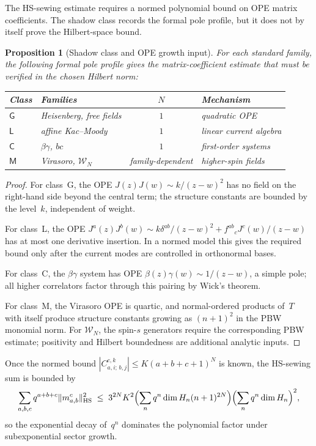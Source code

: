 \documentclass[11pt,reqno]{amsart}
\newtheorem{proposition}[theorem]{Proposition}
\theoremstyle{definition}
\theoremstyle{remark}
\newcommand{\cW}{\mathcal{W}}
\newcommand{\HS}{\mathrm{HS}}
\numberwithin{equation}{section}
\begin{document}
The HS-sewing estimate requires a normed polynomial bound on OPE
matrix coefficients. The shadow class records the formal pole
profile, but it does not by itself prove the Hilbert-space bound.

\begin{proposition}[Shadow class and OPE growth input]
\label{prop:shadow-hs}
For each standard family, the following formal pole profile gives the
matrix-coefficient estimate that must be verified in the chosen
Hilbert norm:
\begin{center}
\renewcommand{\arraystretch}{1.15}
\begin{tabular}{llcl}
\toprule
Class & Families & $N$ & Mechanism \\
\midrule
$\mathsf{G}$ & Heisenberg, free fields
 & $1$ & quadratic OPE \\
$\mathsf{L}$ & affine Kac--Moody
 & $1$ & linear current algebra \\
$\mathsf{C}$ & $\beta\gamma$, $bc$
 & $1$ & first-order systems \\
$\mathsf{M}$ & Virasoro, $\cW_N$
 & family-dependent & higher-spin fields \\
\bottomrule
\end{tabular}
\end{center}
\end{proposition}

\begin{proof}
For class~G, the OPE $J(z)J(w) \sim k/(z-w)^2$ has no field
on the right-hand side beyond the central term; the structure
constants are bounded by the level~$k$, independent of weight.

For class~L, the OPE $J^a(z)J^b(w) \sim
k\delta^{ab}/(z-w)^2 + f^{ab}{}_cJ^c(w)/(z-w)$
has at most one derivative insertion. In a normed model this gives
the required bound only after the current modes are controlled in
orthonormal bases.

For class~C, the $\beta\gamma$ system has OPE
$\beta(z)\gamma(w) \sim 1/(z-w)$, a simple pole; all
higher correlators factor through this pairing by Wick's
theorem.

For class~M, the Virasoro OPE is quartic, and normal-ordered
products of~$T$ with itself produce structure constants growing
as $(n+1)^2$ in the PBW monomial norm. For $\cW_N$, the spin-$s$
generators require the corresponding PBW estimate; positivity and
Hilbert boundedness are additional analytic inputs.
\end{proof}

Once the normed bound
$|C^{c,k}_{a,i;\,b,j}| \leq K(a+b+c+1)^N$ is known, the
HS-sewing sum is bounded by
\[
\sum_{a,b,c} q^{a+b+c}\|m_{a,b}^c\|_{\HS}^2
\;\leq\;
3^{2N}K^2
\Bigl(\sum_n q^n \dim H_n (n+1)^{2N}\Bigr)
\Bigl(\sum_n q^n \dim H_n\Bigr)^2,
\]
so the exponential decay of~$q^n$ dominates the polynomial factor
under subexponential sector growth.
\end{document}
